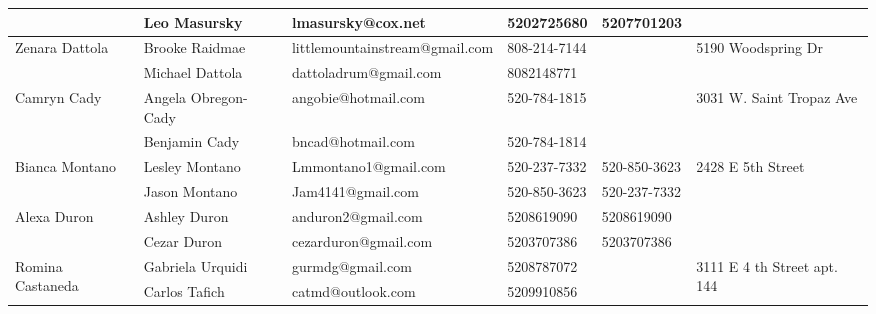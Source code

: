 \documentclass[landscape]{article}\usepackage[]{graphicx}\usepackage[]{color}
\begin{document}
\begin{longtable}{p{70pt}|p{75pt}|p{120pt}|p{60pt}|p{60pt}|p{120pt}|}
 & Leo Masursky & lmasursky@cox.net & 5202725680 & 5207701203 & \\
\hline
\multirow{2}{70pt}{Zenara Dattola} & Brooke Raidmae & littlemountainstream@gmail.com & 808-214-7144 &  & \multirow{2}{100pt}{5190 Woodspring Dr} \\
 & Michael Dattola & dattoladrum@gmail.com & 8082148771 &  & \\
\hline
\multirow{2}{70pt}{Camryn Cady} & Angela Obregon-Cady & angobie@hotmail.com & 520-784-1815 &  & \multirow{2}{100pt}{3031 W. Saint Tropaz Ave} \\
 & Benjamin Cady & bncad@hotmail.com & 520-784-1814 &  & \\
\hline
\multirow{2}{70pt}{Bianca Montano} & Lesley Montano & Lmmontano1@gmail.com & 520-237-7332 & 520-850-3623 & \multirow{2}{100pt}{2428 E 5th Street} \\
 & Jason Montano & Jam4141@gmail.com & 520-850-3623 & 520-237-7332 & \\
\hline
\multirow{2}{70pt}{Alexa Duron} & Ashley Duron & anduron2@gmail.com & 5208619090 & 5208619090 & \multirow{2}{100pt}{} \\
 & Cezar Duron & cezarduron@gmail.com & 5203707386 & 5203707386 & \\
\hline
\multirow{2}{70pt}{Romina Castaneda} & Gabriela Urquidi & gurmdg@gmail.com & 5208787072 &  & \multirow{2}{100pt}{3111 E 4 th Street apt. 144} \\
 & Carlos Tafich & catmd@outlook.com & 5209910856 &  & \\
\hline
\end{longtable}
\newpage
\end{document}
